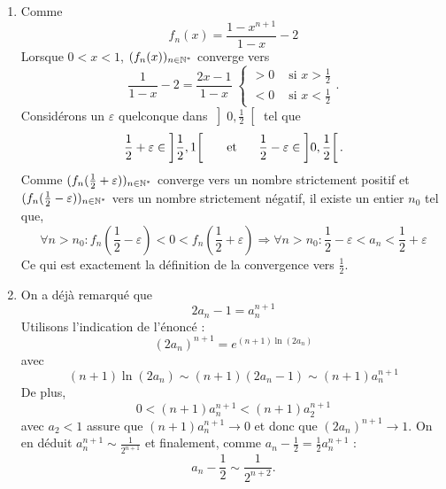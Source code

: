 \begin{enumerate}
\item  Comme 
\begin{displaymath}
 f_{n}(x) = \frac{1-x^{n+1}}{1-x}-2
\end{displaymath}
Lorsque $0<x<1$, $(f_{n}(x))_{n\in \mathbb{N}^{*}}$ converge vers 
\begin{displaymath}
 \frac{1}{1-x}-2 = \frac{2x-1}{1-x}
 \; \left\lbrace 
 \begin{aligned}
  > 0 &\text{ si } x>\frac{1}{2} \\
  < 0 &\text{ si } x<\frac{1}{2} 
 \end{aligned}
\right. .
\end{displaymath}
Consid{\'e}rons un $\varepsilon $ quelconque dans $\left] 0,\frac{1}{2}\right[$ tel que
\begin{displaymath}
 \frac{1}{2}+\varepsilon \in \left]\frac{1}{2},1\right[ \hspace{0.5cm} \text{ et } \hspace{0.5cm}
\frac{1}{2}-\varepsilon \in \left] 0,\frac{1}{2}\right[ .
\end{displaymath}
Comme $(f_{n}(\frac{1}{2}+\varepsilon ))_{n\in \mathbb{N}^{*}}$ converge vers un nombre strictement positif et $(f_{n}(\frac{1}{2}-\varepsilon ))_{n\in \mathbb{N}^{*}}$ vers un nombre strictement n{\'e}gatif, il existe un
entier $n_{0}$ tel que,
\begin{displaymath}
 \forall n>n_{0} : f_{n}(\frac{1}{2}-\varepsilon )<0<f_{n}(\frac{1}{2}+\varepsilon ) 
\Rightarrow
\forall n>n_{0} : \frac{1}{2}-\varepsilon <a_{n}<\frac{1}{2}+\varepsilon 
\end{displaymath}
Ce qui est exactement la d{\'e}finition de la convergence vers $\frac{1}{2}$.

\item  On a d{\'e}j{\`a} remarqu{\'e} que 
\begin{displaymath}
 2a_{n}-1=a_{n}^{n+1}
\end{displaymath}
Utilisons l'indication de l'{\'e}nonc{\'e} : 
\begin{displaymath}
 (2a_{n})^{n+1}=e^{(n+1)\ln (2a_{n})}
\end{displaymath}
avec 
\begin{displaymath}
 (n+1)\ln (2a_{n})\sim (n+1)(2a_{n}-1)\sim (n+1)a_{n}^{n+1}
\end{displaymath}
De plus,
\begin{displaymath}
 0<(n+1)a_{n}^{n+1}<(n+1)a_{2}^{n+1}
\end{displaymath}
avec $a_{2}<1$ assure que $(n+1)a_{n}^{n+1}\rightarrow 0$ et donc que $(2a_{n})^{n+1}\rightarrow 1$.\newline
On en d{\'e}duit $a_{n}^{n+1}\sim \frac{1}{2^{n+1}}$ et finalement, comme $a_{n}-\frac{1}{2}=\frac{1}{2}a_{n}^{n+1}$ :
\[
a_{n}-\frac{1}{2}\sim \frac{1}{2^{n+2}}.
\]
\end{enumerate}
